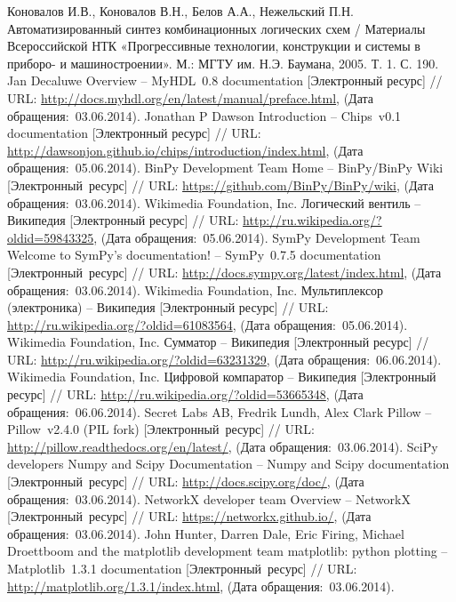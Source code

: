 \documentclass[document.tex]{subfiles}
\begin{document}
\clearpage
{}
\begin{thebibliography}{@@@@}	
			Коновалов И.В., Коновалов В.Н., Белов А.А., Нежельский П.Н.
			Автоматизированный синтез комбинационных логических схем / Материалы
			Всероссийской НТК «Прогрессивные технологии, конструкции и системы в приборо-
			и машиностроении». 
			М.: МГТУ им. Н.Э. Баумана, 2005. Т. 1. С. 190.
			Jan Decaluwe
			Overview -- MyHDL~0.8 documentation
			[Электронный ресурс] //
			URL: {\url{http://docs.myhdl.org/en/latest/manual/preface.html}},
			(Дата обращения:~03.06.2014).
			Jonathan P Dawson
			Introduction -- Chips~v0.1 documentation
			[Электронный ресурс] //
			URL: {\url{http://dawsonjon.github.io/chips/introduction/index.html}},
			(Дата обращения:~05.06.2014).
			BinPy Development Team
			Home -- BinPy/BinPy Wiki
			[Электронный~ресурс] //
			URL: {\url{https://github.com/BinPy/BinPy/wiki}},
			(Дата обращения:~03.06.2014).
			Wikimedia Foundation, Inc.
			Логический вентиль -- Википедия
			[Электронный ресурс] //
			URL: {\url{http://ru.wikipedia.org/?oldid=59843325}},
			(Дата обращения:~05.06.2014).
			SymPy Development Team
			Welcome to SymPy’s documentation! -- SymPy~0.7.5 documentation
			[Электронный~ресурс] //
			URL: {\url{http://docs.sympy.org/latest/index.html}},
			(Дата обращения:~03.06.2014).
			Wikimedia Foundation, Inc.
			Мультиплексор (электроника) -- Википедия
			[Электронный ресурс] //
			URL: {\url{http://ru.wikipedia.org/?oldid=61083564}},
			(Дата обращения:~05.06.2014).
			Wikimedia Foundation, Inc.
			Сумматор -- Википедия
			[Электронный ресурс] //
			URL: {\url{http://ru.wikipedia.org/?oldid=63231329}},
			(Дата обращения:~06.06.2014).
			Wikimedia Foundation, Inc.
			Цифровой компаратор -- Википедия
			[Электронный ресурс] //
			URL: {\url{http://ru.wikipedia.org/?oldid=53665348}},
			(Дата обращения:~06.06.2014).
			Secret Labs AB, Fredrik Lundh, Alex Clark
			Pillow -- Pillow~v2.4.0 (PIL fork)
			[Электронный~ресурс] //
			URL: {\url{http://pillow.readthedocs.org/en/latest/}},
			(Дата обращения:~03.06.2014).
			SciPy developers
			Numpy and Scipy Documentation -- Numpy and Scipy documentation
			[Электронный~ресурс] //
			URL: {\url{http://docs.scipy.org/doc/}},
			(Дата обращения:~03.06.2014).
			NetworkX developer team
			Overview -- NetworkX
			[Электронный~ресурс] //
			URL: {\url{https://networkx.github.io/}},
			(Дата обращения:~03.06.2014).
			John Hunter, Darren Dale, Eric Firing, Michael Droettboom and the matplotlib development team
			matplotlib: python plotting -- Matplotlib~1.3.1 documentation
			[Электронный~ресурс] //
			URL: {\url{http://matplotlib.org/1.3.1/index.html}},
			(Дата обращения:~03.06.2014).
	\end{thebibliography}
\end{document}
